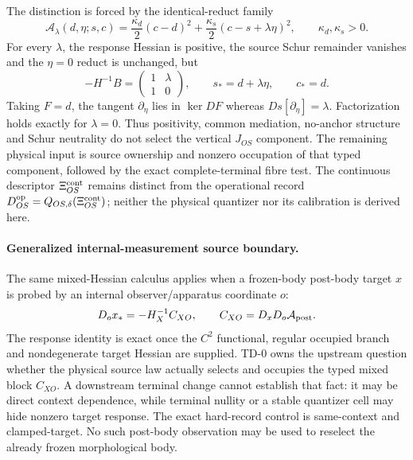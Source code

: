 \documentclass[11pt,a4paper]{article}
\theoremstyle{remark}
\begin{document}
The distinction is forced by the identical-reduct family
\begin{equation}
 \mathcal A_\lambda(d,\eta;s,c)
 =\frac{\kappa_d}{2}(c-d)^2
 +\frac{\kappa_s}{2}(c-s+\lambda\eta)^2,
 \qquad \kappa_d,\kappa_s>0.
 \label{eq:td0-lambda-counterfamily}
\end{equation}
For every $\lambda$, the response Hessian is positive, the source Schur
remainder vanishes and the $\eta=0$ reduct is unchanged, but
\begin{equation}
 -H^{-1}B=
 \begin{pmatrix}1&\lambda\\1&0\end{pmatrix},
 \qquad s_*=d+\lambda\eta,\qquad c_*=d.
\end{equation}
Taking $F=d$, the tangent $\partial_\eta$ lies in $\ker DF$ whereas
$Ds[\partial_\eta]=\lambda$.  Factorization holds exactly for $\lambda=0$.
Thus positivity, common mediation, no-anchor structure and Schur neutrality do
not select the vertical $J_{OS}$ component.  The remaining physical input is
source ownership and nonzero occupation of that typed component, followed by
the exact complete-terminal fibre test.  The continuous descriptor
$\Xi_{OS}^{\rm cont}$ remains distinct from the operational record
$D_{OS}^{\rm op}=Q_{OS,\delta}(\Xi_{OS}^{\rm cont})$; neither the physical
quantizer nor its calibration is derived here.

\paragraph{Generalized internal-measurement source boundary.}
The same mixed-Hessian calculus applies when a frozen-body post-body target
$x$ is probed by an internal observer/apparatus coordinate $o$:
\begin{equation}
 D_o x_*=-H_X^{-1}C_{XO},\qquad
 C_{XO}=D_xD_o\mathcal A_{\rm post}.
 \label{eq:td0-generalized-backaction-source}
\end{equation}
The response identity is exact once the $C^2$ functional, regular occupied
branch and nondegenerate target Hessian are supplied.  TD-0 owns the upstream
question whether the physical source law actually selects and occupies the
typed mixed block $C_{XO}$.  A downstream terminal change cannot establish
that fact: it may be direct context dependence, while terminal nullity or a
stable quantizer cell may hide nonzero target response.  The exact hard-record
control is same-context and clamped-target.  No such post-body observation may
be used to reselect the already frozen morphological body.
\end{document}
